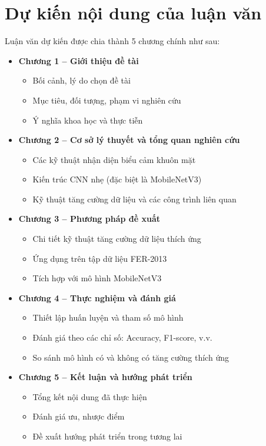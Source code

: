 \section{Dự kiến nội dung của luận văn} %

Luận văn dự kiến được chia thành 5 chương chính như sau:

\begin{itemize}
    \item \textbf{Chương 1 – Giới thiệu đề tài}  
    \begin{itemize}
        \item Bối cảnh, lý do chọn đề tài  
        \item Mục tiêu, đối tượng, phạm vi nghiên cứu  
        \item Ý nghĩa khoa học và thực tiễn  
    \end{itemize}

    \item \textbf{Chương 2 – Cơ sở lý thuyết và tổng quan nghiên cứu}  
    \begin{itemize}
        \item Các kỹ thuật nhận diện biểu cảm khuôn mặt  
        \item Kiến trúc CNN nhẹ (đặc biệt là MobileNetV3)  
        \item Kỹ thuật tăng cường dữ liệu và các công trình liên quan  
    \end{itemize}

    \item \textbf{Chương 3 – Phương pháp đề xuất}  
    \begin{itemize}
        \item Chi tiết kỹ thuật tăng cường dữ liệu thích ứng  
        \item Ứng dụng trên tập dữ liệu FER-2013  
        \item Tích hợp với mô hình MobileNetV3  
    \end{itemize}

    \item \textbf{Chương 4 – Thực nghiệm và đánh giá}  
    \begin{itemize}
        \item Thiết lập huấn luyện và tham số mô hình  
        \item Đánh giá theo các chỉ số: Accuracy, F1-score, v.v.  
        \item So sánh mô hình có và không có tăng cường thích ứng  
    \end{itemize}

    \item \textbf{Chương 5 – Kết luận và hướng phát triển}  
    \begin{itemize}
        \item Tổng kết nội dung đã thực hiện  
        \item Đánh giá ưu, nhược điểm  
        \item Đề xuất hướng phát triển trong tương lai  
    \end{itemize}
\end{itemize}